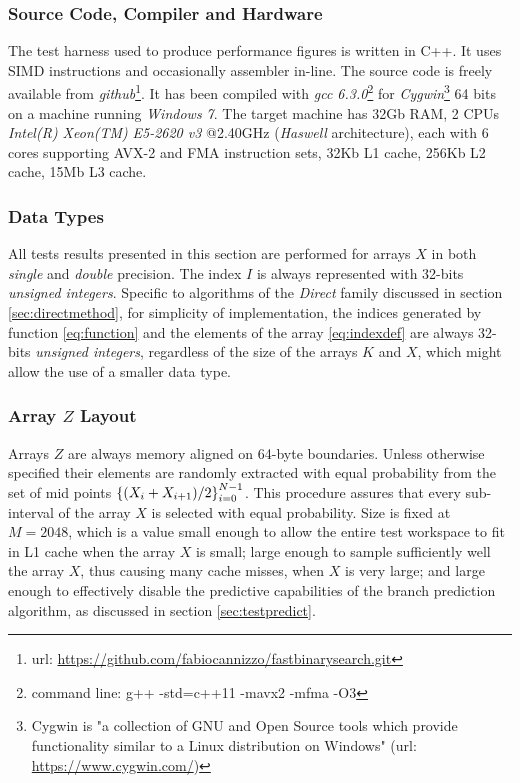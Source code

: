 \documentclass[preprint,1p,times]{elsarticle}
\begin{document}
\subsubsection{Source Code, Compiler and Hardware}
The test harness used to produce performance figures is written in C++. It uses SIMD instructions and occasionally assembler in-line. The source code is freely available from \textit{github}\footnote{url: \url{https://github.com/fabiocannizzo/fastbinarysearch.git}}.
It has been compiled with \textit{gcc 6.3.0}\footnote{command line: g++ -std=c++11 -mavx2 -mfma -O3} for \textit{Cygwin}\footnote{Cygwin is "a collection of GNU and Open Source tools which provide functionality similar to a Linux distribution on Windows" (url: \url{https://www.cygwin.com/})} 64 bits on a machine running \textit{Windows 7}.
The target machine has 32Gb RAM, 2 CPUs \textit{Intel(R) Xeon(TM)} \textit{E5-2620 v3} @2.40GHz (\textit{Haswell} architecture), each with 6 cores supporting AVX-2 and FMA instruction sets, 32Kb L1 cache, 256Kb L2 cache, 15Mb L3 cache.

\subsubsection{Data Types}
All tests results presented in this section are performed for arrays $X$ in both \textit{single} and \textit{double} precision. The index $I$ is always represented with 32-bits \textit{unsigned integers}.
Specific to algorithms of the \textit{Direct} family discussed in section \ref{sec:directmethod}, for simplicity of implementation, the indices generated by function \eqref{eq:function} and the elements of the array \eqref{eq:indexdef}  are always 32-bits \textit{unsigned integers}, regardless of the size of the arrays $K$ and $X$, which might allow the use of a smaller data type.

\subsubsection{Array $Z$ Layout}
\label{sec:arrayz}
Arrays $Z$ are always memory aligned on 64-byte boundaries. Unless otherwise specified their elements are randomly extracted with equal probability from the set of mid points $\left \{ (X_i+X_{i+1})/2 \right \}_{i=0}^{N-1}$. This procedure assures that every sub-interval of the array $X$ is selected with equal probability. Size is fixed at $M=2048$, which is a value small enough to allow the entire test workspace to fit in L1 cache when the array $X$ is small; large enough to sample sufficiently well the array $X$, thus causing many cache misses, when $X$ is very large; and large enough to effectively disable the predictive capabilities of the branch prediction algorithm, as discussed in section \ref{sec:testpredict}.
\end{document}
